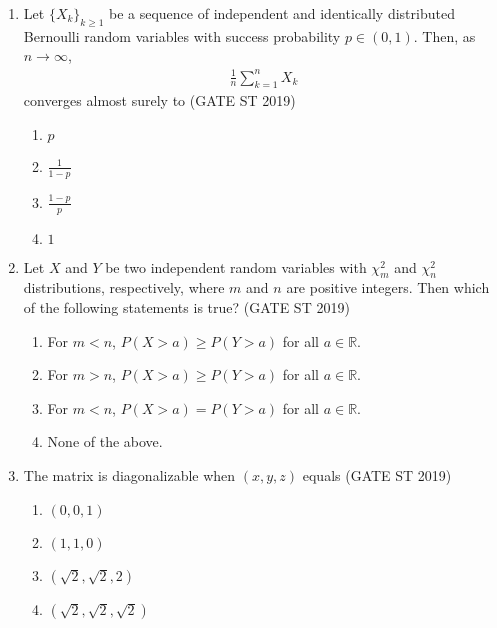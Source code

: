 \documentclass[journal]{IEEEtran}
\begin{document}
\begin{enumerate}[start=1]
\item Let \(\{X_k\}_{k \geq 1}\) be a sequence of independent and identically distributed Bernoulli random variables with success probability \(p \in (0,1)\). Then, as \(n \to \infty\),
\begin{align*}
\frac{1}{n} \sum_{k=1}^n X_k
\end{align*}
converges almost surely to \hfill(GATE ST 2019)
\begin{multicols}{4}
\begin{enumerate}
\item \(p\)
\item \(\frac{1}{1-p}\)
\item \(\frac{1-p}{p}\)
\item \(1\)
\end{enumerate}
\end{multicols}

\item Let \(X\) and \(Y\) be two independent random variables with \(\chi^2_m\) and \(\chi^2_n\) distributions, respectively, where \(m\) and \(n\) are positive integers. Then which of the following statements is true? \hfill(GATE ST 2019)
\begin{enumerate}
\item For \(m < n\), \(P(X > a) \geq P(Y > a)\) for all \(a \in \mathbb{R}\).
\item For \(m > n\), \(P(X > a) \geq P(Y > a)\) for all \(a \in \mathbb{R}\).
\item For \(m < n\), \(P(X > a) = P(Y > a)\) for all \(a \in \mathbb{R}\).
\item None of the above.
\end{enumerate}

\item The matrix
is diagonalizable when \((x,y,z)\) equals \hfill(GATE ST 2019)
\begin{multicols}{4}
\begin{enumerate}
\item \((0,0,1)\)
\item \((1,1,0)\)
\item \((\sqrt{2}, \sqrt{2}, 2)\)
\item \((\sqrt{2}, \sqrt{2}, \sqrt{2})\)
\end{enumerate}
\end{multicols}


\end{enumerate}
\end{document}
